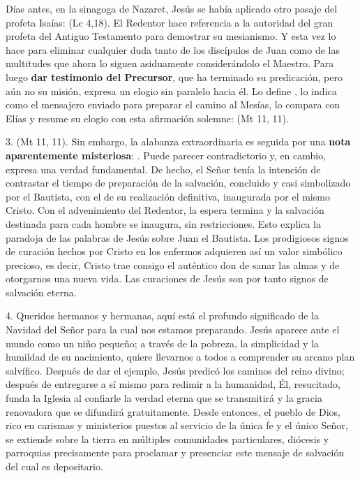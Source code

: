 \begin{body}
					Días antes, en la sinagoga de Nazaret, Jesús se había aplicado otro pasaje del profeta Isaías:  (Lc 4,18). El Redentor hace referencia a la autoridad del gran profeta del Antiguo Testamento para demostrar su mesianismo. Y esta vez lo hace para eliminar cualquier duda tanto de los discípulos de Juan como de las multitudes que ahora lo siguen asiduamente considerándolo el Maestro. Para luego \textbf{dar testimonio del Precursor}, que ha terminado su predicación, pero aún no su misión, expresa un elogio sin paralelo hacia él. Lo define , lo indica como el mensajero enviado para preparar el camino al Mesías, lo compara con Elías y resume su elogio con esta afirmación solemne:  (Mt 11, 11).
					
					3.  (Mt 11, 11). Sin embargo, la alabanza extraordinaria es seguida por una \textbf{nota aparentemente misteriosa}: . Puede parecer contradictorio y, en cambio, expresa una verdad fundamental. De hecho, el Señor tenía la intención de contrastar el tiempo de preparación de la salvación, concluido y casi simbolizado por el Bautista, con el de su realización definitiva, inaugurada por el mismo Cristo. Con el advenimiento del Redentor, la espera termina y la salvación destinada para cada hombre se inaugura, sin restricciones. Esto explica la paradoja de las palabras de Jesús sobre Juan el Bautista. Los prodigiosos signos de curación hechos por Cristo en los enfermos adquieren así un valor simbólico precioso, es decir, Cristo trae consigo el auténtico don de sanar las almas y de otorgarnos una nueva vida. Las curaciones de Jesús son por tanto signos de salvación eterna.
					
					4. Queridos hermanos y hermanas, aquí está el profundo significado de la Navidad del Señor para la cual nos estamos preparando. Jesús aparece ante el mundo como un niño pequeño; a través de la pobreza, la simplicidad y la humildad de su nacimiento, quiere llevarnos a todos a comprender su arcano plan salvífico. Después de dar el ejemplo, Jesús predicó los caminos del reino divino; después de entregarse a sí mismo para redimir a la humanidad, Él, resucitado, funda la Iglesia al confiarle la verdad eterna que se transmitirá y la gracia renovadora que se difundirá gratuitamente. Desde entonces, el pueblo de Dios, rico en carismas y ministerios puestos al servicio de la única fe y el único Señor, se extiende sobre la tierra en múltiples comunidades particulares, diócesis y parroquias precisamente para proclamar y presenciar este mensaje de salvación del cual es depositario.
					

\end{body}
